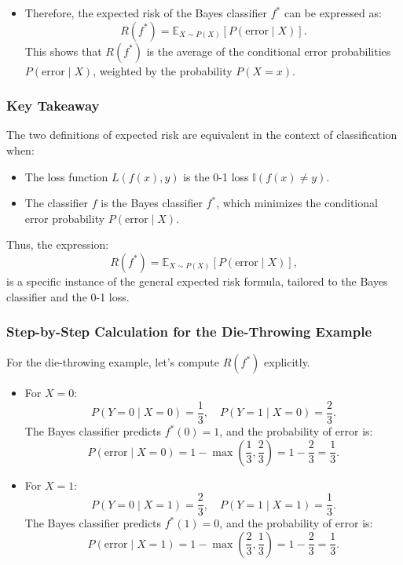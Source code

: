 \begin{notechapter}
\begin{itemize}
    \item Therefore, the expected risk of the Bayes classifier \( f^* \) can be expressed as:
      \[
      R(f^*) = \mathbb{E}_{X \sim P(X)}[P(\text{error} \mid X)].
      \]
      This shows that \( R(f^*) \) is the average of the conditional error probabilities \( P(\text{error} \mid X) \), weighted by the probability \( P(X = x) \).
\end{itemize}

\subsubsection{Key Takeaway}
The two definitions of expected risk are equivalent in the context of classification when:
\begin{itemize}
    \item The loss function \( L(f(x), y) \) is the 0-1 loss \( \mathbb{I}(f(x) \neq y) \).
    \item The classifier \( f \) is the Bayes classifier \( f^* \), which minimizes the conditional error probability \( P(\text{error} \mid X) \).
\end{itemize}
Thus, the expression:
\[
R(f^*) = \mathbb{E}_{X \sim P(X)}[P(\text{error} \mid X)],
\]
is a specific instance of the general expected risk formula, tailored to the Bayes classifier and the 0-1 loss.

\subsubsection{Step-by-Step Calculation for the Die-Throwing Example}
For the die-throwing example, let's compute \( R(f^*) \) explicitly.

\begin{itemize}
    \item For \( X = 0 \):
      \[
      P(Y = 0 \mid X = 0) = \frac{1}{3}, \quad P(Y = 1 \mid X = 0) = \frac{2}{3}.
      \]
      The Bayes classifier predicts \( f^*(0) = 1 \), and the probability of error is:
      \[
      P(\text{error} \mid X = 0) = 1 - \max\left( \frac{1}{3}, \frac{2}{3} \right) = 1 - \frac{2}{3} = \frac{1}{3}.
      \]

    \item For \( X = 1 \):
      \[
      P(Y = 0 \mid X = 1) = \frac{2}{3}, \quad P(Y = 1 \mid X = 1) = \frac{1}{3}.
      \]
      The Bayes classifier predicts \( f^*(1) = 0 \), and the probability of error is:
      \[
      P(\text{error} \mid X = 1) = 1 - \max\left( \frac{2}{3}, \frac{1}{3} \right) = 1 - \frac{2}{3} = \frac{1}{3}.
      \]


\end{itemize}
\end{notechapter}
